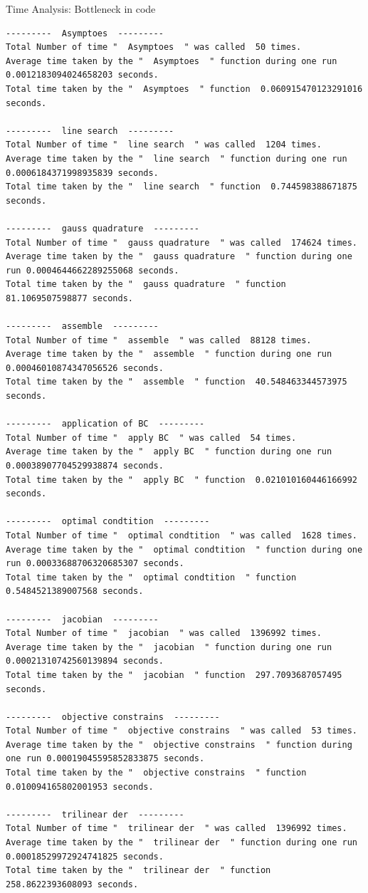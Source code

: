 \documentclass[a4paper,12pt,times]{article}
\begin{document}
\begin{section}{Time Analysis: Bottleneck in code}
\begin{lstlisting}
---------  Asymptoes  ---------
Total Number of time "  Asymptoes  " was called  50 times.
Average time taken by the "  Asymptoes  " function during one run 0.0012183094024658203 seconds.
Total time taken by the "  Asymptoes  " function  0.060915470123291016 seconds. 

---------  line search  ---------
Total Number of time "  line search  " was called  1204 times.
Average time taken by the "  line search  " function during one run 0.0006184371998935839 seconds.
Total time taken by the "  line search  " function  0.744598388671875 seconds. 

---------  gauss quadrature  ---------
Total Number of time "  gauss quadrature  " was called  174624 times.
Average time taken by the "  gauss quadrature  " function during one run 0.0004644662289255068 seconds.
Total time taken by the "  gauss quadrature  " function  81.1069507598877 seconds. 

---------  assemble  ---------
Total Number of time "  assemble  " was called  88128 times.
Average time taken by the "  assemble  " function during one run 0.00046010874347056526 seconds.
Total time taken by the "  assemble  " function  40.548463344573975 seconds. 

---------  application of BC  ---------
Total Number of time "  apply BC  " was called  54 times.
Average time taken by the "  apply BC  " function during one run 0.00038907704529938874 seconds.
Total time taken by the "  apply BC  " function  0.021010160446166992 seconds. 

---------  optimal condtition  ---------
Total Number of time "  optimal condtition  " was called  1628 times.
Average time taken by the "  optimal condtition  " function during one run 0.00033688706320685307 seconds.
Total time taken by the "  optimal condtition  " function  0.5484521389007568 seconds. 

---------  jacobian  ---------
Total Number of time "  jacobian  " was called  1396992 times.
Average time taken by the "  jacobian  " function during one run 0.00021310742560139894 seconds.
Total time taken by the "  jacobian  " function  297.7093687057495 seconds. 

---------  objective constrains  ---------
Total Number of time "  objective constrains  " was called  53 times.
Average time taken by the "  objective constrains  " function during one run 0.00019045595852833875 seconds.
Total time taken by the "  objective constrains  " function  0.010094165802001953 seconds. 

---------  trilinear der  ---------
Total Number of time "  trilinear der  " was called  1396992 times.
Average time taken by the "  trilinear der  " function during one run 0.00018529972924741825 seconds.
Total time taken by the "  trilinear der  " function  258.8622393608093 seconds. 
\end{lstlisting}
\end{section}
\end{document}
